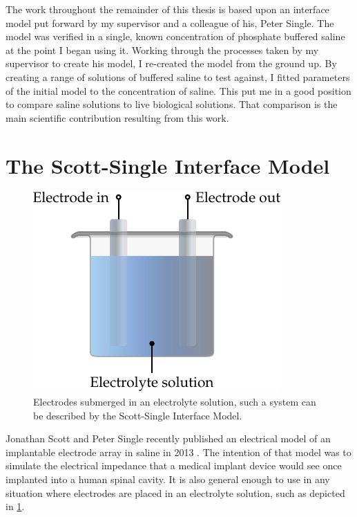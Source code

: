 
The work throughout the remainder of this thesis is based upon an interface model put forward by my supervisor and a colleague of his, Peter Single.
The model was verified in a single, known concentration of phosphate buffered saline at the point I began using it.
Working through the processes taken by my supervisor to create his model, I re-created the model from the ground up.
By creating a range of solutions of buffered saline to test against, I fitted parameters of the initial model to the concentration of saline.
This put me in a good position to compare saline solutions to live biological solutions.
That comparison is the main scientific contribution resulting from this work.

\section{The Scott-Single Interface Model}

  \begin{figure}
    \centering
    \includegraphics{content/pt2/07-InterfaceModel/graphics/electrode-electrolyte}
    \caption{\label{fig:electrode-electrolyte}Electrodes submerged in an electrolyte solution, such a system can be described by the Scott-Single Interface Model.}
  \end{figure}

  Jonathan Scott and Peter Single recently published an electrical model of an implantable electrode array in saline in 2013 \cite{ScottSingle2013}.
  The intention of that model was to simulate the electrical impedance that a medical implant device would see once implanted into a human spinal cavity.
  It is also general enough to use in any situation where electrodes are placed in an electrolyte solution, such as depicted in \cref{fig:electrode-electrolyte}.

